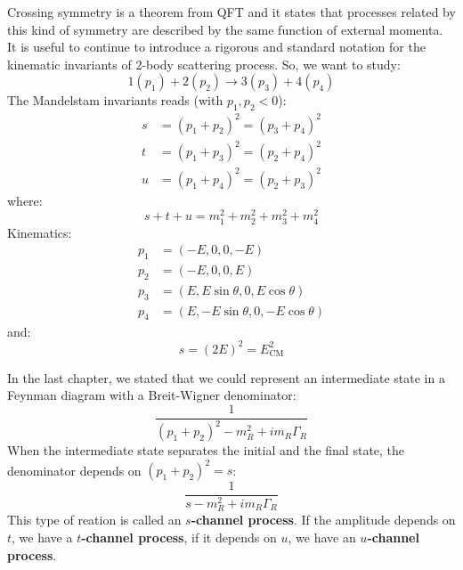 \documentclass[../../main/main.tex]{subfiles}
\begin{document}
Crossing symmetry is a theorem from QFT and it states that processes related by this kind of symmetry are described by the same function of external momenta. It is useful to continue to introduce a rigorous and standard notation for the kinematic invariants of 2-body scattering process. So, we want to study:
\begin{equation}
	1(p_1) + 2(p_2)
	\longrightarrow
	3(p_3) + 4(p_4)
	\label{eq:}
\end{equation}
The Mandelstam invariants reads (with \( p_1, p_2 < 0 \)):
\begin{subequations}
	\begin{align}
		s &= (p_1 + p_2)^2 = (p_3 + p_4)^2	\\
		t &= (p_1 + p_3)^2 = (p_2 + p_4)^2	\\
		u &= (p_1 + p_4)^2 = (p_2 + p_3)^2
	\end{align}
	\label{eq:L08_MI}
\end{subequations}
where:
\begin{equation}
	s + t + u
	=
	m_1^2 + m_2^2 + m_3^2 + m_4^2
	\label{eq:}
\end{equation}
Kinematics:
\begin{subequations}
	\begin{align}
		p_1 &= (-E, 0, 0, -E)	\\
		p_2 &= (-E, 0, 0,  E)	\\
		p_3 &= (E, E\sin \theta, 0, E\cos \theta)	\\
		p_4 &= (E, -E\sin \theta, 0, -E\cos \theta)
	\end{align}
	\label{}
\end{subequations}
and:
\begin{equation}
	s = (2E)^2 = E^2_\mathrm{CM}
	\label{eq:}
\end{equation}

In the last chapter, we stated that we could represent an intermediate state in a Feynman diagram with a Breit-Wigner denominator:
\begin{equation}
	\frac{1}{(p_1+p_2)^2 - m^2_R + im_R\Gamma_R}
	\label{eq:}
\end{equation}
When the intermediate state separates the initial and the final state, the denominator depends on \( (p_1 + p_2)^2 = s \):
\begin{equation}
	\frac{1}{s - m^2_R + im_R\Gamma_R}
	\label{eq:}
\end{equation}
This type of reation is called an \textbf{\( s \)-channel process}. If the amplitude depends on \( t \), we have a \textbf{\( t \)-channel process}, if it depends on \( u \), we have an \textbf{\( u \)-channel process}.
\end{document}
